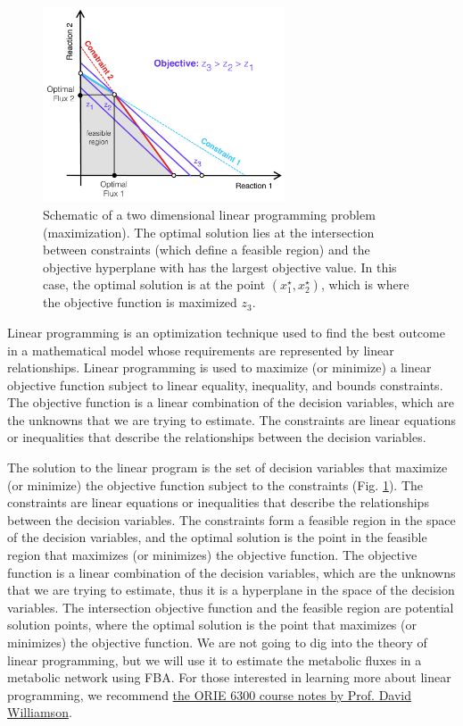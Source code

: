 \documentclass{article}[11pt]
\begin{document}
\begin{figure}
  \centering
\includegraphics[width=0.64\textwidth]{./figs/Fig-LinearProgramming-Schematic.pdf}
\caption{Schematic of a two dimensional linear programming problem (maximization).
The optimal solution lies at the intersection between constraints (which define a feasible region) and the objective hyperplane with has the largest objective value.
In this case, the optimal solution is at the point $(x_{1}^{\star},x_{2}^{\star})$, which is where the objective function is maximized $z_{3}$.
}\label{fig:LinearProgramming-Schematic}
\end{figure}

Linear programming is an optimization technique used to find the best outcome in a mathematical model whose requirements are represented by linear relationships.
Linear programming is used to maximize (or minimize) a linear objective function subject to linear equality, inequality, and bounds constraints.
The objective function is a linear combination of the decision variables, which are the unknowns that we are trying to estimate.
The constraints are linear equations or inequalities that describe the relationships between the decision variables.

The solution to the linear program is the set of decision variables that maximize (or minimize) the objective function subject to the constraints (Fig. \ref{fig:LinearProgramming-Schematic}).
The constraints are linear equations or inequalities that describe the relationships between the decision variables.
The constraints form a feasible region in the space of the decision variables, and the optimal solution is the point in the feasible region that maximizes (or minimizes) the objective function.
The objective function is a linear combination of the decision variables, which are the unknowns that we are trying to estimate, thus it is a hyperplane in the space of the decision variables.
The intersection objective function and the feasible region are potential solution points, where the optimal solution is the point that maximizes (or minimizes) the objective function.
We are not going to dig into the theory of linear programming, but we will use it to estimate the metabolic fluxes in a metabolic network using FBA.
For those interested in learning more about linear programming, we recommend \href{https://people.orie.cornell.edu/dpw/orie6300/}{the ORIE 6300 course notes by Prof. David Williamson}.
\end{document}
